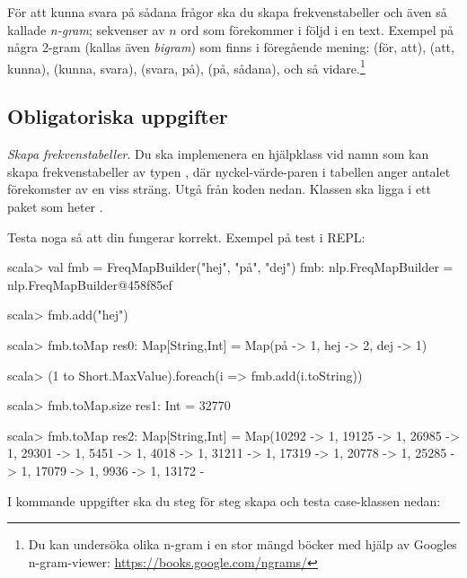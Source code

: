 \noindent För att kunna svara på sådana frågor ska du skapa frekvenstabeller och även så kallade \emph{n-gram}; sekvenser av $n$ ord som förekommer i följd i en text. Exempel på några 2-gram (kallas även \emph{bigram}) som finns i föregående mening: (för, att), (att, kunna), (kunna, svara), (svara, på), (på, sådana), och så vidare.\footnote{Du kan undersöka olika n-gram i en stor mängd böcker med hjälp av Googles n-gram-viewer: \url{https://books.google.com/ngrams/}}

\subsection{Obligatoriska uppgifter}


\Task \emph{Skapa frekvenstabeller}. Du ska implemenera en hjälpklass vid namn  som kan skapa frekvenstabeller av typen , där nyckel-värde-paren i tabellen anger antalet förekomster av en viss sträng. Utgå från koden nedan. %
Klassen  ska ligga i ett paket som heter .

\begin{figure}[H]
\end{figure}

\noindent Testa noga så att din  fungerar korrekt. Exempel på test i REPL:
\begin{REPL}
scala> val fmb = FreqMapBuilder("hej", "på", "dej")
fmb: nlp.FreqMapBuilder = nlp.FreqMapBuilder@458f85ef

scala> fmb.add("hej")

scala> fmb.toMap
res0: Map[String,Int] = Map(på -> 1, hej -> 2, dej -> 1)

scala> (1 to Short.MaxValue).foreach(i => fmb.add(i.toString))

scala> fmb.toMap.size
res1: Int = 32770

scala> fmb.toMap
res2: Map[String,Int] = Map(10292 -> 1, 19125 -> 1, 26985 -> 1, 29301 -> 1, 5451 -> 1, 4018 -> 1, 31211 -> 1, 17319 -> 1, 20778 -> 1, 25285 -> 1, 17079 -> 1, 9936 -> 1, 13172 -
\end{REPL}

\noindent I kommande uppgifter ska du steg för steg skapa och testa case-klassen  nedan:%

